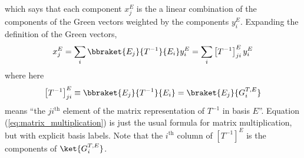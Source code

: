 which says that each component $x_j^E$ is the a linear combination of the components of the Green vectors weighted by the components $y_i^E$.
Expanding the definition of the Green vectors,
\begin{equation}
  x_j^E = \sum_i \bbraket{E_j}{T^{-1}}{E_i} y_i^E = \sum_i \left[ T^{-1} \right]^E_{ji} y^E_i \label{eq:matrix_multiplication}
\end{equation}
where here
\begin{equation}
  \left[ T^{-1} \right]^E_{ji} \equiv \bbraket{E_j}{T^{-1}}{E_i} = \braket{E_j}{G_i^{T,E}}
  \label{eq:matrix_elements_vs_green_vector_elements}
\end{equation}
means ``the $ji^\text{th}$ element of the matrix representation of $T^{-1}$ in basis $E$''.
Equation (\ref{eq:matrix_multiplication}) is just the usual formula for matrix multiplication, but with explicit basis labels.
Note that the $i^\text{th}$ column of $\left[ T^{-1} \right]^E$ is the components of $\ket{G_i^{T,E}}$.


